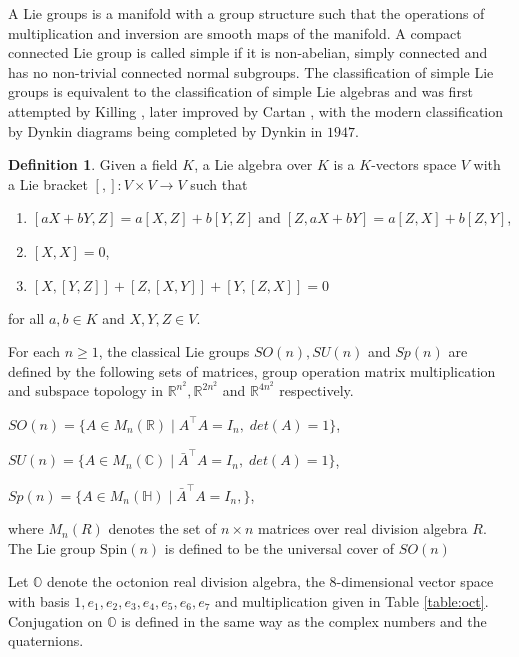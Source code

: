 \documentclass{article}
\theoremstyle{plain}
\theoremstyle{definition}
\newtheorem{defn}[thm]{Definition}
\numberwithin{thm}{section}
\begin{document}
		A Lie groups is a manifold with a group structure such that the operations of multiplication and inversion are smooth maps of the manifold.
		A compact connected Lie group is called simple if it is non-abelian, simply connected and has no non-trivial connected normal subgroups.
		The classification of simple Lie groups is equivalent to the classification of simple Lie algebras and was first attempted by Killing \cite{Killing1888},
		later improved by Cartan \cite{Cartan1914}, with the modern classification by Dynkin diagrams being completed by Dynkin in $1947$.
		\begin{defn}
			Given a field $K$, a Lie algebra over $K$ is a $K$-vectors space $V$ with a Lie bracket $[,]\colon V\times V \to V$ such that
			\begin{enumerate}
				\item
					$[aX+bY,Z]=a[X,Z]+b[Y,Z] \; \text{and} \; [Z,aX+bY]=a[Z,X]+b[Z,Y]$,
				\item
					$[X,X]=0$,
				\item
					$[X,[Y,Z]]+[Z,[X,Y]]+[Y,[Z,X]]=0$
			\end{enumerate}
			for all $a,b\in K$ and $X,Y,Z\in V$.
		\end{defn}
		For each $n\geq 1$, the classical Lie groups $SO(n), SU(n)$ and $Sp(n)$ are defined by the following sets of matrices, group operation matrix multiplication and
		subspace topology in $\mathbb{R}^{n^2},\mathbb{R}^{2n^2}$ and $\mathbb{R}^{4n^2}$ respectively.
		\begin{center}
		$SO(n)=\{ A \in M_{n}(\mathbb{R}) \;|\; {A}^{\intercal} A = I_{n},\; det(A)=1 \}$,
		\end{center}
		\begin{center}
		$SU(n)=\{ A \in M_{n}(\mathbb{C}) \;|\; {\bar{A}}^{\intercal} A = I_{n},\; det(A)=1 \}$,
		\end{center}
		\begin{center}
		$Sp(n)=\{ A \in M_{n}(\mathbb{H}) \;|\; {\bar{A}}^{\intercal} A = I_{n}, \}$,
		\end{center}
		where $M_{n}(R)$ denotes the set of $n \times n$ matrices over real division algebra $R$.
		The Lie group $\mathrm{Spin}(n)$ is defined to be the universal cover of $SO(n)$

		Let $\mathbb{O}$ denote the octonion real division algebra, the $8$-dimensional vector space with basis $1,e_1,e_2,e_3,e_4,e_5,e_6,e_7$
		and multiplication given in Table \ref{table:oct}.
		Conjugation on $\mathbb{O}$ is defined in the same way as the complex numbers and the quaternions.
		  
\end{document}
